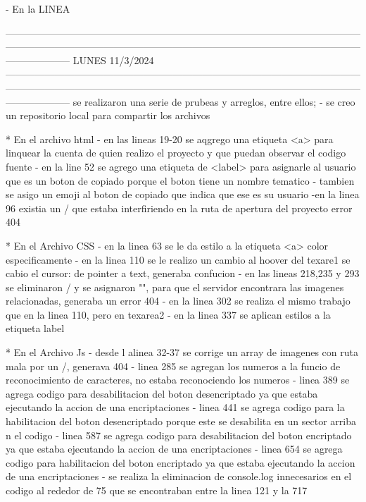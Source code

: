             - En la LINEA 

--------------------------------------------------------------------------------------------------------------------------------------------------------------------------------------------------------------------------------------------
                                                                     LUNES 11/3/2024
--------------------------------------------------------------------------------------------------------------------------------------------------------------------------------------------------------------------------------------------
    se realizaron una serie de prubeas y arreglos, entre ellos;
    - se creo un repositorio local para compartir los archivos

    * En el archivo html
      - en las lineas 19-20 se aqgrego una etiqueta <a> para linquear la cuenta de quien realizo el proyecto y que puedan observar el codigo fuente
      - en la line 52 se agrego una etiqueta de <label> para asignarle al usuario que es un boton de copiado porque el boton tiene un nombre tematico 
      - tambien se asigo un emoji al boton de copiado que indica que ese es su usuario
      -en la linea 96 existia un / que estaba interfiriendo en la ruta de apertura del proyecto error 404

    * En el Archivo CSS
      - en la linea 63 se le da estilo a la etiqueta <a> color especificamente
      - en la linea 110 se le realizo un cambio al hoover del texare1 se cabio el cursor: de pointer a text, generaba confucion 
      - en las lineas 218,235 y 293 se eliminaron / y se asignaron "", para que el servidor encontrara las imagenes relacionadas, generaba un error 404
      - en la linea 302 se realiza el mismo trabajo que en la linea 110, pero en texarea2
      - en la linea 337 se aplican estilos a la etiqueta label 
    
    * En el Archivo Js
      - desde l alinea 32-37 se corrige un array de imagenes con ruta mala por un /, generava 404
      - linea 285 se agregan los numeros a la funcio de reconocimiento de caracteres, no estaba reconociendo los numeros 
      - linea 389 se agrega codigo para desabilitacion del boton desencriptado ya que estaba ejecutando la accion de una encriptaciones
      - linea 441 se agrega codigo para la habilitacion del boton desencriptado porque este se desabilita en un sector arriba n el codigo 
      - linea 587 se agrega codigo para desabilitacion del boton encriptado ya que estaba ejecutando la accion de una encriptaciones
      - linea 654 se agrega codigo para habilitacion del boton encriptado ya que estaba ejecutando la accion de una encriptaciones
      - se realiza la eliminacion de console.log innecesarios en el codigo al rededor de 75 que se encontraban entre la linea 121 y la 717
    
